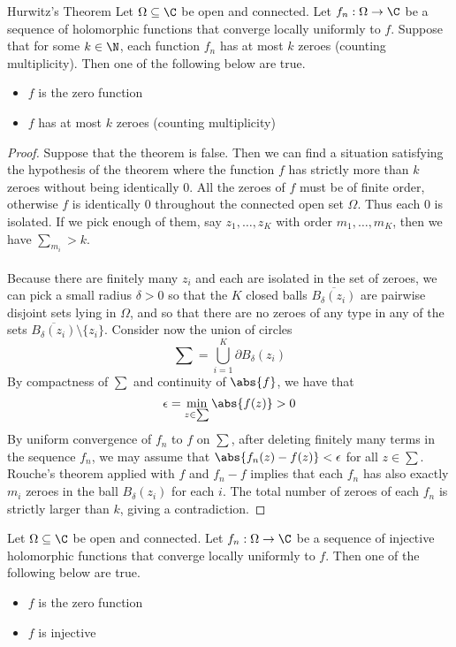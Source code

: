\documentclass[a4paper]{article}
\begin{document}
\begin{thm}{Hurwitz's Theorem}{} Let $\Omega\subseteq\C$ be open and connected. Let $f_n:\Omega\to\C$ be a sequence of holomorphic functions that converge locally uniformly to $f$. Suppose that for some $k\in\N$, each function $f_n$ has at most $k$ zeroes (counting multiplicity). Then one of the following below are true. 
\begin{itemize}
\item $f$ is the zero function
\item $f$ has at most $k$ zeroes (counting multiplicity)
\end{itemize} \tcbline
\begin{proof}
Suppose that the theorem is false. Then we can find a situation satisfying the hypothesis of the theorem where the function $f$ has strictly more than $k$ zeroes without being identically $0$. All the zeroes of $f$ must be of finite order, otherwise $f$ is identically $0$ throughout the connected open set $\Omega$. Thus each $0$ is isolated. If we pick enough of them, say $z_1,\dots,z_K$ with order $m_1,\dots,m_K$, then we have $\sum_{m_i}>k$. \\~\\

Because there are finitely many $z_i$ and each are isolated in the set of zeroes, we can pick a small radius $\delta>0$ so that the $K$ closed balls $\overline{B_\delta(z_i)}$ are pairwise disjoint sets lying in $\Omega$, and so that there are no zeroes of any type in any of the sets $\overline{B_\delta(z_i)}\setminus\{z_i\}$. Consider now the union of circles $$\sum=\bigcup_{i=1}^K\partial B_\delta(z_i)$$ By compactness of $\sum$ and continuity of $\abs{f}$, we have that $$\epsilon=\min_{z\in\sum}\abs{f(z)}>0$$ By uniform convergence of $f_n$ to $f$ on $\sum$, after deleting finitely many terms in the sequence $f_n$, we may assume that $\abs{f_n(z)-f(z)}<\epsilon$ for all $z\in\sum$. Rouche's theorem applied with $f$ and $f_n-f$ implies that each $f_n$ has also exactly $m_i$ zeroes in the ball $B_\delta(z_i)$ for each $i$. The total number of zeroes of each $f_n$ is strictly larger than $k$, giving a contradiction. 
\end{proof}
\end{thm}

\begin{crl}{}{}  Let $\Omega\subseteq\C$ be open and connected. Let $f_n:\Omega\to\C$ be a sequence of injective holomorphic functions that converge locally uniformly to $f$. Then one of the following below are true. 
\begin{itemize}
\item $f$ is the zero function
\item $f$ is injective
\end{itemize}
\end{crl}
\end{document}
